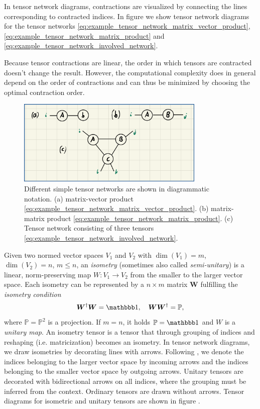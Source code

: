In tensor network diagrams, contractions are visualized by connecting the lines corresponding to contracted indices. In figure  we show tensor network diagrams for the tensor networks \eqref{eq:example_tensor_network_matrix_vector_product}, \eqref{eq:example_tensor_network_matrix_product} and \eqref{eq:example_tensor_network_involved_network}. \par
Because tensor contractions are linear, the order in which tensors are contracted doesn't change the result. However, the computational complexity does in general depend on the order of contractions and can thus be minimized by choosing the optimal contraction order. \par
\begin{figure}
	\centering
	\includegraphics[width=0.8\textwidth]{figures/Tensor_Networks/basic_tensor_network_diagrams.jpeg}
	\caption{Different simple tensor networks are shown in diagrammatic notation. (a) matrix-vector product \eqref{eq:example_tensor_network_matrix_vector_product}. (b) matrix-matrix product \eqref{eq:example_tensor_network_matrix_product}. (c) Tensor network consisting of three tensors \eqref{eq:example_tensor_network_involved_network}.}
	\label{fig:basic_tensor_network_diagrams}
\end{figure}
Given two normed vector spaces $V_1$ and $V_2$ with $\dim\left(V_1\right) = m$, $\dim\left(V_2\right) = n$, $m \le n$, an \textit{isometry} (sometimes also called \textit{semi-unitary}) is a linear, norm-preserving map $W: V_1 \rightarrow V_2$ from the smaller to the larger vector space. Each isometry can be represented by a $n\times m$ matrix $\bm{W}$ fulfilling the \textit{isometry condition}
\begin{equation}
	\label{eq:isometry_condition_general}
	\bm{W}^\dagger\bm{W} = \id, \quad \bm{W}\bm{W}^\dagger = \mathbb{P},
\end{equation}
where $\mathbb{P} = \mathbb{P}^2$ is a projection. If $m = n$, it holds $\mathbb{P} = \id$ and $W$ is a \textit{unitary map}. An isometry tensor is a tensor that through grouping of indices and reshaping (i.e. matricization) becomes an isometry. In tensor network diagrams, we draw isometries by decorating lines with arrows. Following \cite{cite:isometric_tensor_network_states_in_two_dimensions, cite:efficient_simulation_of_dynamics_in_two_dimensional_quantum_spin_systems}, we denote the indices belonging to the larger vector space by incoming arrows and the indices belonging to the smaller vector space by outgoing arrows. Unitary tensors are decorated with bidirectional arrows on all indices, where the grouping must be inferred from the context. Ordinary tensors are drawn without arrows. Tensor diagrams for isometric and unitary tensors are shown in figure .

